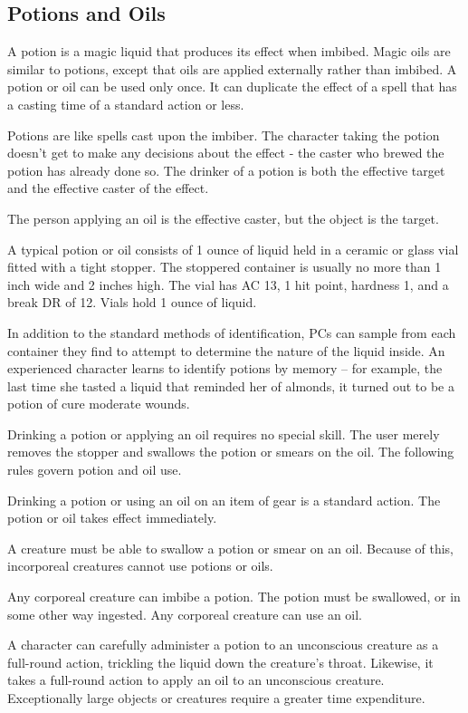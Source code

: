 \subsection{Potions and Oils}

A potion is a magic liquid that produces its effect when imbibed.
Magic oils are similar to potions, except that oils are applied externally rather than imbibed.
A potion or oil can be used only once.
It can duplicate the effect of a spell that has a casting time of a standard action or less.

Potions are like spells cast upon the imbiber.
The character taking the potion doesn't get to make any decisions about the effect  - the caster who brewed the potion has already done so.
The drinker of a potion is both the effective target and the effective caster of the effect.

The person applying an oil is the effective caster, but the object is the target.

 A typical potion or oil consists of 1 ounce of liquid held in a ceramic or glass vial fitted with a tight stopper.
The stoppered container is usually no more than 1 inch wide and 2 inches high.
The vial has AC 13, 1 hit point, hardness 1, and a break DR of 12.
Vials hold 1 ounce of liquid.

 In addition to the standard methods of identification, PCs can sample from each container they find to attempt to determine the nature of the liquid inside.
An experienced character learns to identify potions by memory -- for example, the last time she tasted a liquid that reminded her of almonds, it turned out to be a potion of cure moderate wounds.

 Drinking a potion or applying an oil requires no special skill.
The user merely removes the stopper and swallows the potion or smears on the oil.
The following rules govern potion and oil use.

Drinking a potion or using an oil on an item of gear is a standard action.
The potion or oil takes effect immediately.

A creature must be able to swallow a potion or smear on an oil.
Because of this, incorporeal creatures cannot use potions or oils.

Any corporeal creature can imbibe a potion.
The potion must be swallowed, or in some other way ingested.
Any corporeal creature can use an oil.

A character can carefully administer a potion to an unconscious creature as a full-round action, trickling the liquid down the creature's throat.
Likewise, it takes a full-round action to apply an oil to an unconscious creature.
Exceptionally large objects or creatures require a greater time expenditure.

